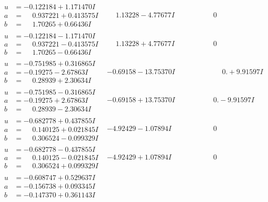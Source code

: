 \documentclass[1p]{elsarticle_modified}
\theoremstyle{definition}
\begin{document}
$$\begin{array}{c|c|c}
\begin{aligned}
u &= -0.122184 + 1.171470 I \\
a &= \phantom{-}0.937221 + 0.413575 I \\
b &= \phantom{-}1.70265 + 0.66436 I\end{aligned}
 & \phantom{-}1.13228 - 4.77677 I & \phantom{-0.000000 } 0 \\ \hline\begin{aligned}
u &= -0.122184 - 1.171470 I \\
a &= \phantom{-}0.937221 - 0.413575 I \\
b &= \phantom{-}1.70265 - 0.66436 I\end{aligned}
 & \phantom{-}1.13228 + 4.77677 I & \phantom{-0.000000 } 0 \\ \hline\begin{aligned}
u &= -0.751985 + 0.316865 I \\
a &= -0.19275 - 2.67863 I \\
b &= \phantom{-}0.28939 + 2.30634 I\end{aligned}
 & -0.69158 - 13.75370 I & \phantom{-0.000000 -}0. + 9.91597 I \\ \hline\begin{aligned}
u &= -0.751985 - 0.316865 I \\
a &= -0.19275 + 2.67863 I \\
b &= \phantom{-}0.28939 - 2.30634 I\end{aligned}
 & -0.69158 + 13.75370 I & \phantom{-0.000000 } 0. - 9.91597 I \\ \hline\begin{aligned}
u &= -0.682778 + 0.437855 I \\
a &= \phantom{-}0.140125 + 0.021845 I \\
b &= \phantom{-}0.306524 - 0.099329 I\end{aligned}
 & -4.92429 - 1.07894 I & \phantom{-0.000000 } 0 \\ \hline\begin{aligned}
u &= -0.682778 - 0.437855 I \\
a &= \phantom{-}0.140125 - 0.021845 I \\
b &= \phantom{-}0.306524 + 0.099329 I\end{aligned}
 & -4.92429 + 1.07894 I & \phantom{-0.000000 } 0 \\ \hline\begin{aligned}
u &= -0.608747 + 0.529637 I \\
a &= -0.156738 + 0.093345 I \\
b &= -0.147370 + 0.361143 I\end{aligned}

\end{array}$$
\end{document}
